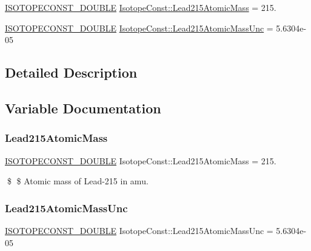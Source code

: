 \begin{DoxyCompactItemize}
\item 
\mbox{\hyperlink{group___isotope_const-_macros_ga8f45a7272ce02c0b4c65c44636ed719a}{I\+S\+O\+T\+O\+P\+E\+C\+O\+N\+S\+T\+\_\+\+D\+O\+U\+B\+LE}} \mbox{\hyperlink{group___isotope_const-_lead-_pb215_ga01fabeb37bd273405a9b863883aa37f5}{Isotope\+Const\+::\+Lead215\+Atomic\+Mass}} = 215.
\item 
\mbox{\hyperlink{group___isotope_const-_macros_ga8f45a7272ce02c0b4c65c44636ed719a}{I\+S\+O\+T\+O\+P\+E\+C\+O\+N\+S\+T\+\_\+\+D\+O\+U\+B\+LE}} \mbox{\hyperlink{group___isotope_const-_lead-_pb215_ga8abcdb9b76032ab6a07b26c50f59b74f}{Isotope\+Const\+::\+Lead215\+Atomic\+Mass\+Unc}} = 5.\+6304e-\/05
\end{DoxyCompactItemize}


\subsection{Detailed Description}


\subsection{Variable Documentation}
\mbox{\label{group___isotope_const-_lead-_pb215_ga01fabeb37bd273405a9b863883aa37f5}} 
\subsubsection{\texorpdfstring{Lead215\+Atomic\+Mass}{Lead215AtomicMass}}
{\footnotesize\ttfamily \mbox{\hyperlink{group___isotope_const-_macros_ga8f45a7272ce02c0b4c65c44636ed719a}{I\+S\+O\+T\+O\+P\+E\+C\+O\+N\+S\+T\+\_\+\+D\+O\+U\+B\+LE}} Isotope\+Const\+::\+Lead215\+Atomic\+Mass = 215.}

\$ \$ Atomic mass of Lead-\/215 in amu. \mbox{\label{group___isotope_const-_lead-_pb215_ga8abcdb9b76032ab6a07b26c50f59b74f}} 
\subsubsection{\texorpdfstring{Lead215\+Atomic\+Mass\+Unc}{Lead215AtomicMassUnc}}
{\footnotesize\ttfamily \mbox{\hyperlink{group___isotope_const-_macros_ga8f45a7272ce02c0b4c65c44636ed719a}{I\+S\+O\+T\+O\+P\+E\+C\+O\+N\+S\+T\+\_\+\+D\+O\+U\+B\+LE}} Isotope\+Const\+::\+Lead215\+Atomic\+Mass\+Unc = 5.\+6304e-\/05}

